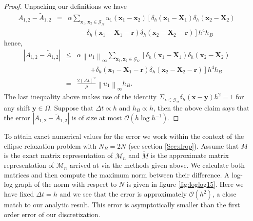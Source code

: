 \documentclass[preprint,12pt]{elsarticle}
\newcommand{\norm}[1]{\left\lVert#1\right\rVert}
\begin{document}
\begin{proof}
Unpacking our definitions we have
\begin{eqnarray}
\nonumber
A_{1,2}-\tilde{A}_{1,2} &=& 
\alpha\sum_{\mathbf{x}_1,\mathbf{x}_2\in\mathcal{G}_\Omega}
u_1(\mathbf{x}_1 - \mathbf{x}_2)
\left[
\delta_h(\mathbf{x}_1 - \mathbf{X}_1)
\delta_h(\mathbf{x}_2 - \mathbf{X}_2) \right. \\ &&\qquad\left.
-
\delta_h(\mathbf{x}_1 - \mathbf{X}_1 - \mathbf{r})
\delta_h(\mathbf{x}_2 - \mathbf{X}_2 - \mathbf{r})
\right]h^4h_B
\end{eqnarray}
hence,
\begin{eqnarray} \nonumber
|A_{1,2}-\tilde{A}_{1,2}|
&\leq& \nonumber
\alpha\norm{u_1}_\infty
\sum_{\mathbf{x}_1,\mathbf{x}_2\in\mathcal{G}_\Omega}
\left[
\delta_h(\mathbf{x}_1 - \mathbf{X}_1)
\delta_h(\mathbf{x}_2 - \mathbf{X}_2) \right. \\ &&\qquad\left.
+
\delta_h(\mathbf{x}_1 - \mathbf{X}_1 - \mathbf{r})
\delta_h(\mathbf{x}_2 - \mathbf{X}_2 - \mathbf{r})
\right]h^4h_B \\
&=&
\frac{2(\Delta t)^2}{\rho} \norm{u_1}_\infty h_B.
\end{eqnarray}
The last inequality above makes use of the identity $\Sigma_{\mathbf{x}\in\mathcal{G}_\Omega}\delta_h(\mathbf{x}-\mathbf{y})h^2=1$ for any shift $\mathbf{y}\in\Omega$.
Suppose that $\Delta t \propto h$ and $h_B \propto h$, then the above claim says that the error $|A_{1,2}-\tilde{A}_{1,2}|$ is of size at most $\mathcal{O}(h\log h^{-1})$.
\end{proof}

To attain exact numerical values for the error we work within the context of the ellipse relaxation problem with $N_B=2N$ (see section \ref{Sec:drop}).
Assume that $M$ is the exact matrix representation of $\mathcal{M}_n$ and $\tilde{M}$ is the approximate matrix representation of $\mathcal{M}_n$ arrived at via the methods given above. We calculate both matrices and then compute the maximum norm between their difference. A log-log graph of the norm with respect to $N$ is given in figure \ref{fig:loglog15}. Here we have fixed $\Delta t = h$ and we see that the error is approximately $\mathcal{O}(h^2)$, a close match to our analytic result. This error is asymptotically smaller than the first order error of our discretization.
\end{document}
